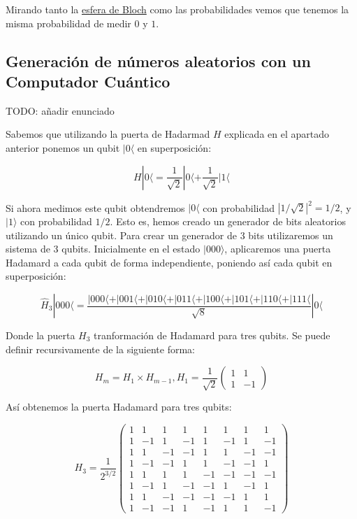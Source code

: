 \documentclass[11pt]{article}
\newcommand{\ra}{\rangle}
\newcommand{\la}{\langle}
\begin{document}
Mirando tanto la \href{URL}{esfera de Bloch} como las probabilidades vemos que tenemos la misma probabilidad de medir $0$ y $1$.

\subsection{Generación de números aleatorios con un Computador Cuántico}

TODO: añadir enunciado

Sabemos que utilizando la puerta de Hadarmad $H$ explicada en el apartado anterior ponemos un qubit $|0\la$ en superposición:

\[
	H|0\la = \frac{1}{\sqrt 2} |0\la + \frac{1}{\sqrt 2} |1\la
\]

Si ahora medimos este qubit obtendremos $|0\la$ con probabilidad $|1/\sqrt 2|^2 = 1/2$, y $|1\ra$ con probabilidad $1/2$. Esto es, hemos creado un generador de bits aleatorios utilizando un único qubit. Para crear un generador de 3 bits utilizaremos un sistema de 3 qubits. Inicialmente en el estado $|000\ra$, aplicaremos una puerta Hadamard a cada qubit de forma independiente, poniendo así cada qubit en superposición:

\[
	\hat H_3|000\la = \frac{|000\la + |001\la + |010\la + |011\la + |100\la + |101\la + |110\la + |111\la}{\sqrt 8} |0\la
\]

Donde la puerta $H_3$ tranformación de Hadamard para tres qubits. Se puede definir recursivamente de la siguiente forma:

\[
	H_m = H_1 \times H_{m-1}, H_1 = \frac{1}{\sqrt 2}
	\begin{pmatrix}
		1 & 1 \\
		1 & -1 
	\end{pmatrix}
\]

Así obtenemos la puerta Hadamard para tres qubits:

\[
H_3 = \frac{1}{2^{3/2}}
\begin{pmatrix}
	1 & 1 & 1 & 1 & 1 & 1 & 1 & 1 \\
	1 & -1 & 1 & -1 & 1 & -1 & 1 & -1 \\
	1 & 1 & -1 & -1 & 1 & 1 & -1 & -1 \\
	1 & -1 & -1 & 1 & 1 & -1 & -1 & 1 \\
	1 & 1 & 1 & 1 & -1 & -1 & -1 & -1 \\
	1 & -1 & 1 & -1 & -1 & 1 & -1 & 1 \\
	1 & 1 & -1 & -1 & -1 & -1 & 1 & 1 \\
	1 & -1 & -1 & 1 & -1 & 1 & 1 & -1
\end{pmatrix}
\]
\end{document}

